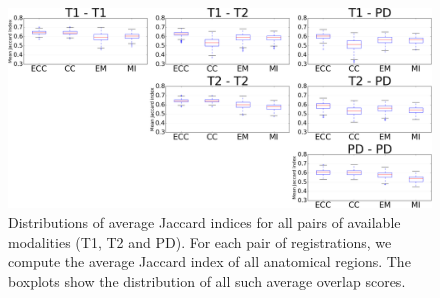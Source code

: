 \begin{figure}[H]
\centering
    \includegraphics[width=\linewidth]{./images/all_modality_pairs_boxplots.png}
    \caption{Distributions of average Jaccard indices for all pairs of available modalities (T1, T2 and PD). For each pair of registrations, we compute the average Jaccard index of all anatomical regions. The boxplots show the distribution of all such average overlap scores.}
\label{fig:all_pairs_boxplots}
\end{figure}
